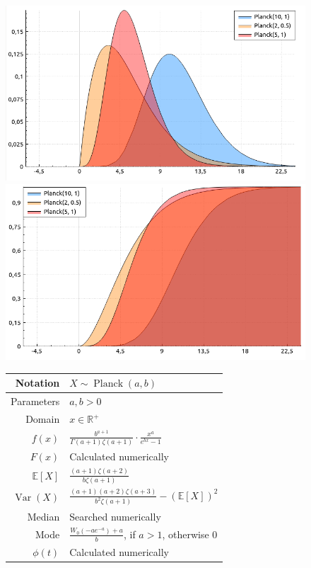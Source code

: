 \documentclass[a4paper,11pt]{article}
\theoremstyle{plain}
\theoremstyle{definition}
\newcommand{\ME}{\mathbb{E}}
\newcommand{\MR}{\mathbb{R}}
\newcommand{\Var}{\operatorname{Var}}
\begin{document}
	\begin{figure}[!htb]\centering
		\begin{minipage}{0.55\textwidth}
			\includegraphics[width=\linewidth, right]{planck_pdf}
			\captionsetup{labelformat=empty}
			\includegraphics[width=\linewidth, right]{planck_cdf}
			\captionsetup{labelformat=empty}
		\end{minipage}
		\begin{minipage}{0.4\textwidth}
		\begin{tabular}{| r | l |}
			\hline
			Notation & $X \sim \operatorname{Planck}(a, b)$ \\
			\hline
			Parameters & $a, b > 0$ \\
			\hline
			Domain & $ x \in \MR^+$  \\
			\hline
			$f(x)$ & $\frac{b^{a+1}}{\Gamma(a+1)\zeta(a+1)} \cdot \frac{x ^ a}{e^{bx} - 1}$ \\
			\hline
			$F(x)$ & Calculated numerically \\
			\hline
			$\ME[X]$ & $ \frac{(a+1)\zeta(a+2)}{b \zeta(a+1)}$ \\
			\hline
			$\Var(X)$ & $\frac{(a+1)(a+2)\zeta(a+3)}{b^2 \zeta(a+1)}  - (\ME[X])^2$ \\
			\hline
			Median & Searched numerically \\
			\hline
			Mode & $\frac{W_0(-a e^{-a}) + a}{b}$, if $a > 1$, otherwise $0$ \\
			\hline
			$\phi(t)$ & Calculated numerically \\
			\hline
		\end{tabular}
	\end{minipage}
    \end{figure}
\end{document}
